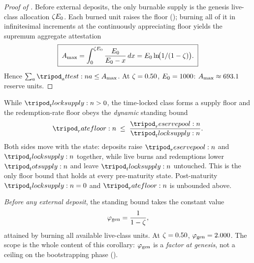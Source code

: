 \documentclass[../main.tex]{subfiles}
\begin{document}
\begin{proof}[Proof of ]
    Before external deposits, the only burnable supply is the genesis live-class allocation
    $\zeta E\sb{0}$. Each burned unit raises the floor
    (); burning all of it in infinitesimal
    increments at the continuously appreciating floor yields the supremum aggregate
    attestation
    \begin{equation}
        \boxed{\;
        A\sb{\max}
        = \int_0^{\zeta E\sb{0}} \frac{E\sb{0}}{E\sb{0} - x}\,dx
        = E\sb{0} \ln\!\bigl(1/(1-\zeta)\bigr).
        \;}
        \label{eq:containment:max-attestation}
    \end{equation}
    Hence $\sum_{a} \attest{a} \leq \attestcap$. At $\zeta = 0.50$,
    $E\sb{0} = 1000$: $A\sb{\max} \approx 693.1$ reserve units.
\end{proof}

\begin{proposition}
    \label{prop:containment:time-locked-standing-bound}
    While $\tlocksupply{} > 0$, the time-locked class forms a supply floor and the
    redemption-rate floor obeys the \emph{dynamic} standing bound
    \begin{equation}
        \ratefloor{} \;\leq\; \frac{\reservepool{}}{\tlocksupply{}}.
        \label{eq:containment:time-locked-standing-bound}
    \end{equation}
    Both sides move with the state: deposits raise $\reservepool{}$ and $\tlocksupply{}$
    together, while live burns and redemptions lower $\totsupply{}$ and leave
    $\tlocksupply{}$ untouched. This is the only floor bound that holds at every
    pre-maturity state. Post-maturity $\tlocksupply{} = 0$ and $\ratefloor{}$ is unbounded
    above.
\end{proposition}

\begin{corollary}
    \label{cor:containment:pre-deposit-floor-factor}
    \emph{Before any external deposit}, the standing bound
     takes the constant value
    \begin{equation}
        \varphi\sb{\mathrm{gen}} = \frac{1}{1 - \zeta},
        \label{eq:containment:pre-deposit-floor-factor}
    \end{equation}
    attained by burning all available live-class units. At $\zeta = 0.50$,
    $\varphi\sb{\mathrm{gen}} = 2.000$. The scope is the whole content of this corollary:
    $\varphi\sb{\mathrm{gen}}$ is a \emph{factor at genesis}, not a ceiling on the bootstrapping
    phase ().
\end{corollary}
\end{document}
